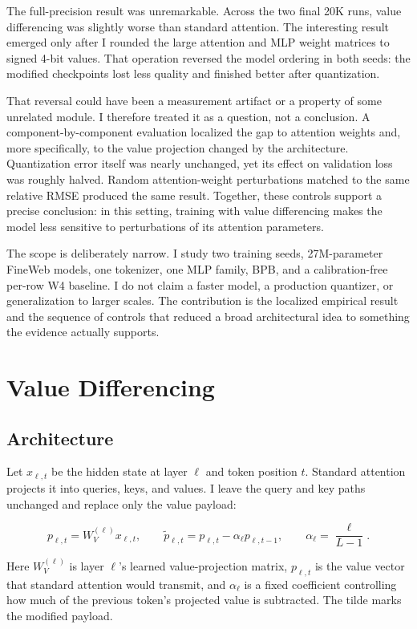 \documentclass[10pt]{article}
\begin{document}
The full-precision result was unremarkable. Across the two final 20K runs, value differencing was slightly worse than standard attention. The interesting result emerged only after I rounded the large attention and MLP weight matrices to signed 4-bit values. That operation reversed the model ordering in both seeds: the modified checkpoints lost less quality and finished better after quantization.

That reversal could have been a measurement artifact or a property of some unrelated module. I therefore treated it as a question, not a conclusion. A component-by-component evaluation localized the gap to attention weights and, more specifically, to the value projection changed by the architecture. Quantization error itself was nearly unchanged, yet its effect on validation loss was roughly halved. Random attention-weight perturbations matched to the same relative RMSE produced the same result. Together, these controls support a precise conclusion: in this setting, training with value differencing makes the model less sensitive to perturbations of its attention parameters.

The scope is deliberately narrow. I study two training seeds, 27M-parameter FineWeb models, one tokenizer, one MLP family, BPB, and a calibration-free per-row W4 baseline. I do not claim a faster model, a production quantizer, or generalization to larger scales. The contribution is the localized empirical result and the sequence of controls that reduced a broad architectural idea to something the evidence actually supports.

\section{Value Differencing}\label{value-differencing}

\subsection{Architecture}\label{architecture}

Let \(x_{\ell,t}\) be the hidden state at layer \(\ell\) and token position \(t\). Standard attention projects it into queries, keys, and values. I leave the query and key paths unchanged and replace only the value payload:

\[
p_{\ell,t}=W^{(\ell)}_Vx_{\ell,t}, \qquad
\widetilde p_{\ell,t}=p_{\ell,t}-\alpha_\ell p_{\ell,t-1}, \qquad
\alpha_\ell=\frac{\ell}{L-1}.
\]

Here \(W_V^{(\ell)}\) is layer \(\ell\)'s learned value-projection matrix, \(p_{\ell,t}\) is the value vector that standard attention would transmit, and \(\alpha_\ell\) is a fixed coefficient controlling how much of the previous token's projected value is subtracted. The tilde marks the modified payload.
\end{document}
